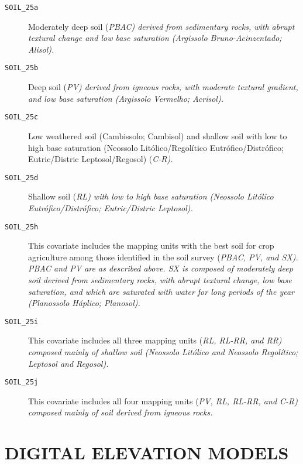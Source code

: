 \begin{description}
  \item[\tt{SOIL\_25a}] Moderately deep soil (\it{PBAC}) derived from sedimentary rocks, with abrupt textural
  change and low base saturation (Argissolo Bruno-Acinzentado; Alisol).
  
  \item[\tt{SOIL\_25b}] Deep soil (\it{PV}) derived from igneous rocks, with moderate textural gradient,
  and low base saturation (Argissolo Vermelho; Acrisol).
 
  \item[\tt{SOIL\_25c}] Low weathered soil (Cambissolo; Cambisol) and shallow soil with low to high base
  saturation (Neossolo Litólico/Regolítico Eutrófico/Distrófico; Eutric/Distric Leptosol/Regosol) (\it{C-R}).
 
  \item[\tt{SOIL\_25d}] Shallow soil (\it{RL}) with low to high base saturation (Neossolo Litólico 
  Eutrófico/Distrófico; Eutric/Distric Leptosol).
 
  \item[\tt{SOIL\_25h}] This covariate includes the mapping units with the best soil for crop agriculture
  among those identified in the soil survey (\it{PBAC}, \it{PV}, and \it{SX}). \it{PBAC} and \it{PV} are as
  described above. \textit{SX} is composed of moderately deep soil derived from sedimentary rocks, with abrupt 
  textural change, low base saturation, and which are saturated with water for long periods of the year 
  (Planossolo Háplico; Planosol).
  
  \item[\tt{SOIL\_25i}] This covariate includes all three mapping units (\it{RL}, \it{RL-RR}, and \it{RR})
  composed mainly of shallow soil (Neossolo Litólico and Neossolo Regolítico; Leptosol and Regosol).
  
  \item[\tt{SOIL\_25j}] This covariate includes all four mapping units (\it{PV}, \it{RL}, \it{RL-RR}, and 
  \it{C-R}) composed mainly of soil derived from igneous rocks.
\end{description}

\section{DIGITAL ELEVATION MODELS}
\label{sec:covar-data-dem}


